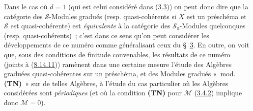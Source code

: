 \begin{remark}[8.14.12]
Dans le cas où $d=1$ (qui est celui considéré dans
(\hyperref[subsection:II.3.3-fr]{3.3})) on peut donc dire que la catégorie des
$\mathcal{S}$-Modules gradués (resp. quasi-cohérents si $X$ est un préschéma
et $\mathcal{S}$ est quasi-cohérente) est \emph{équivalente} à la catégorie
des $\mathcal{S}_0$-Modules quelconques (resp. quasi-cohérents)~; c'est dans
ce sens qu'on peut considérer les développements de ce numéro comme
généralisant ceux du \S~\hyperref[section:II.3-fr]{3}. En outre, on voit que,
sous des conditions de finitude convenables, les résultats de ce numéro
(joints à (\hyperref[II.8.14.11-fr]{8.14.11})) ramènent dans une certaine
mesure l'étude des Algèbres graduées quasi-cohérentes sur un préschéma, et des
Modules gradués «~mod. \textbf{(TN)}~» sur de telles Algèbres, à l'étude du
cas particulier où les Algèbres considérées sont \emph{périodiques} (et où
la condition \textbf{(TN)} pour $\mathcal{M}$
(\hyperref[II.3.4.2-fr]{3.4.2}) implique donc $\mathcal{M}=0$).
\end{remark}

